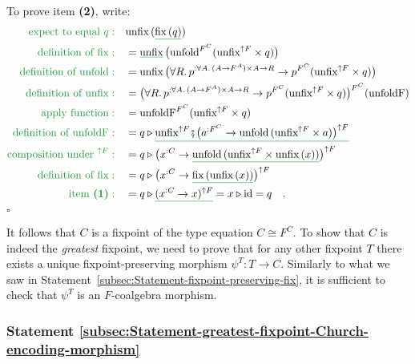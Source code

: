 To prove item \textbf{(2)}, write: 
\begin{align*}
{\color{greenunder}\text{expect to equal }q:}\quad & \text{unfix}\,(\gunderline{\text{fix}\,(q)})\\
{\color{greenunder}\text{definition of }\text{fix}:}\quad & =\gunderline{\text{unfix}}\,\big(\text{unfold}^{F^{C}}(\text{unfix}^{\uparrow F}\times q)\big)\\
{\color{greenunder}\text{definition of }\text{unfold}:}\quad & =\text{unfix}\,\big(\forall R.\,p^{:\forall A.\,(A\rightarrow F^{A})\times A\rightarrow R}\rightarrow p^{F^{C}}(\text{unfix}^{\uparrow F}\times q)\big)\\
{\color{greenunder}\text{definition of }\text{unfix}:}\quad & =\big(\forall R.\,p^{:\forall A.\,(A\rightarrow F^{A})\times A\rightarrow R}\rightarrow p^{F^{C}}(\text{unfix}^{\uparrow F}\times q)\big)^{F^{C}}(\text{unfoldF})\\
{\color{greenunder}\text{apply function}:}\quad & =\text{unfoldF}^{F^{C}}(\text{unfix}^{\uparrow F}\times q)\\
{\color{greenunder}\text{definition of }\text{unfoldF}:}\quad & =q\triangleright\gunderline{\text{unfix}^{\uparrow F}\bef\big(a^{:F^{C}}\rightarrow\text{unfold}\,(\text{unfix}^{\uparrow F}\times a)\big)^{\uparrow F}}\\
{\color{greenunder}\text{composition under }^{\uparrow F}:}\quad & =q\triangleright\big(x^{:C}\rightarrow\gunderline{\text{unfold}\,(\text{unfix}^{\uparrow F}\times\text{unfix}\,(x))}\big)^{\uparrow F}\\
{\color{greenunder}\text{definition of }\text{fix}:}\quad & =q\triangleright\big(x^{:C}\rightarrow\gunderline{\text{fix}\,(\text{unfix}\,(x))}\big)^{\uparrow F}\\
{\color{greenunder}\text{item \textbf{(1)}}:}\quad & =q\triangleright\gunderline{(x^{:C}\rightarrow x)^{\uparrow F}}=x\triangleright\text{id}=q\quad.
\end{align*}
$\square$

It follows that $C$ is a fixpoint of the type equation $C\cong F^{C}$.
To show that $C$ is indeed the \emph{greatest} fixpoint, we need
to prove that for any other fixpoint $T$ there exists a unique fixpoint-preserving
morphism $\psi^{T}:T\rightarrow C$. Similarly to what we saw in Statement~\ref{subsec:Statement-fixpoint-preserving-fix},
it is sufficient to check that $\psi^{T}$ is an $F$-coalgebra morphism.

\subsubsection{Statement \label{subsec:Statement-greatest-fixpoint-Church-encoding-morphism}\ref{subsec:Statement-greatest-fixpoint-Church-encoding-morphism}}

